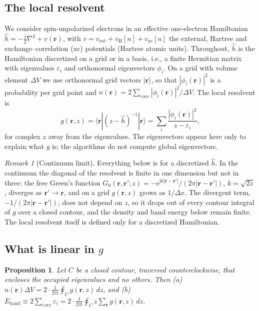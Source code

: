 \documentclass[aps,prb,twocolumn,superscriptaddress,floatfix,longbibliography]{revtex4-2}
\newtheorem{proposition}{Proposition}
\theoremstyle{remark}
\newtheorem{remark}{Remark}
\newcommand{\ee}{\mathrm{e}}
\newcommand{\ii}{\mathrm{i}}
\begin{document}
\subsection{The local resolvent}

We consider spin-unpolarized electrons in an effective one-electron Hamiltonian $\hat h=-\tfrac12\nabla^2+v(\bm r)$, with
$v=v_\mathrm{ext}+v_\mathrm{H}[n]+v_\mathrm{xc}[n]$ the external, Hartree and exchange--correlation (xc) potentials
(Hartree atomic units). Throughout, $\hat h$ is the Hamiltonian discretized on a grid or in a basis, i.e., a finite
Hermitian matrix with eigenvalues $\varepsilon_i$ and orthonormal eigenvectors $\phi_i$. On a grid with volume element
$\Delta V$ we use orthonormal grid vectors $|\bm r\rangle$, so that $|\phi_i(\bm r)|^2$ is a probability per grid point and
$n(\bm r)=2\sum_{i\,\mathrm{occ}}|\phi_i(\bm r)|^2/\Delta V$. The local resolvent is
\begin{equation}
g(\bm r,z)=\langle\bm r|(z-\hat h)^{-1}|\bm r\rangle=\sum_i\frac{|\phi_i(\bm r)|^2}{z-\varepsilon_i},
\label{eq:g}
\end{equation}
for complex $z$ away from the eigenvalues. The eigenvectors appear here only to explain what $g$ is; the algorithms do
not compute global eigenvectors.

\begin{remark}[Continuum limit]\label{rem:continuum}
Everything below is for a discretized $\hat h$. In the continuum the diagonal of the resolvent is finite in one dimension but
not in three: the free Green's
function $G_0(\bm r,\bm r';z)=-\ee^{\ii k|\bm r-\bm r'|}/(2\pi|\bm r-\bm r'|)$, $k=\sqrt{2z}$, diverges as $\bm r'\to\bm r$,
and on a grid $g(\bm r,z)$ grows as $1/\Delta x$. The divergent term, $-1/(2\pi|\bm r-\bm r'|)$, does not depend on $z$, so it
drops out of every contour integral of $g$ over a closed contour, and the density and band energy below remain finite.
The local resolvent itself is defined only for a discretized Hamiltonian.
\end{remark}

\subsection{What is linear in $g$}

\begin{proposition}\label{prop:rep}
Let $C$ be a closed contour, traversed counterclockwise, that encloses the occupied eigenvalues and no others. Then
(a)~$n(\bm r)\Delta V=2\cdot\frac{1}{2\pi\ii}\oint_C g(\bm r,z)\,dz$, and
(b)~$E_\mathrm{band}\equiv2\sum_{i\,\mathrm{occ}}\varepsilon_i=2\cdot\frac{1}{2\pi\ii}\oint_C z\sum_{\bm r}g(\bm r,z)\,dz$.
\end{proposition}
\end{document}
